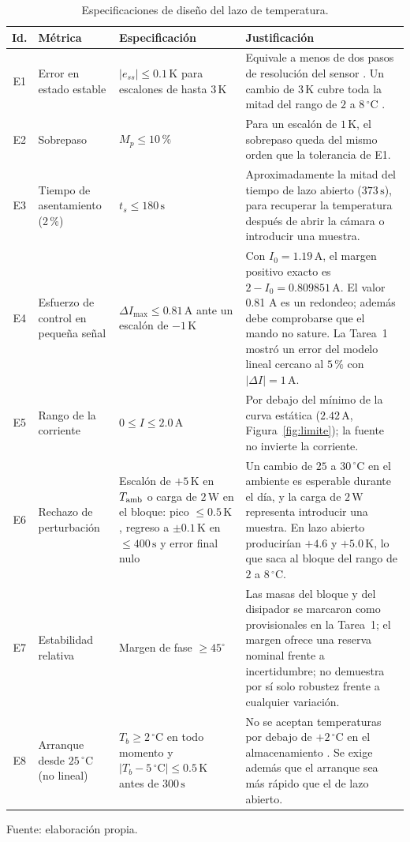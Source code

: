 \documentclass[journal,twocolumn]{IEEEtran}
\begin{document}
\begin{table}[!tbp]\centering
\caption{Especificaciones de diseño del lazo de temperatura.}\label{tab:especificaciones}
{\footnotesize\setlength{\tabcolsep}{3pt}\renewcommand{\arraystretch}{1.15}
\begin{tabularx}{\textwidth}{c>{\raggedright\arraybackslash}p{3.4cm}>{\raggedright\arraybackslash}p{5.2cm}>{\raggedright\arraybackslash}X}\toprule
Id. & Métrica & Especificación & Justificación\\\midrule
E1 & Error en estado estable & $|e_{ss}|\le0.1\,\mathrm K$ para escalones de hasta $3\,\mathrm K$ & Equivale a menos de dos pasos de resolución del sensor \cite{ds18b20}. Un cambio de $3\,\mathrm K$ cubre toda la mitad del rango de $2$ a $8\,^\circ\mathrm C$ \cite{who_pqs}.\\
E2 & Sobrepaso & $M_p\le10\,\%$ & Para un escalón de $1\,\mathrm K$, el sobrepaso queda del mismo orden que la tolerancia de E1.\\
E3 & Tiempo de asentamiento (2\,\%) & $t_s\le180\,\mathrm s$ & Aproximadamente la mitad del tiempo de lazo abierto ($373\,\mathrm s$), para recuperar la temperatura después de abrir la cámara o introducir una muestra.\\
E4 & Esfuerzo de control en pequeña señal & $\Delta I_{\max}\le0.81\,\mathrm A$ ante un escalón de $-1\,\mathrm K$ & Con $I_0=1.19\,\mathrm A$, el margen positivo exacto es $2-I_0=0.809851\,\mathrm A$. El valor 0.81 A es un redondeo; además debe comprobarse que el mando no sature. La Tarea~1 mostró un error del modelo lineal cercano al $5\,\%$ con $|\Delta I|=1\,\mathrm A$.\\
E5 & Rango de la corriente & $0\le I\le2.0\,\mathrm A$ & Por debajo del mínimo de la curva estática ($2.42\,\mathrm A$, Figura~\ref{fig:limite}); la fuente no invierte la corriente.\\
E6 & Rechazo de perturbación & Escalón de $+5\,\mathrm K$ en $T_{\rm amb}$ o carga de $2\,\mathrm W$ en el bloque: pico $\le0.5\,\mathrm K$, regreso a $\pm0.1\,\mathrm K$ en $\le400\,\mathrm s$ y error final nulo & Un cambio de $25$ a $30\,^\circ\mathrm C$ en el ambiente es esperable durante el día, y la carga de $2\,\mathrm W$ representa introducir una muestra. En lazo abierto producirían $+4.6$ y $+5.0\,\mathrm K$, lo que saca al bloque del rango de $2$ a $8\,^\circ\mathrm C$.\\
E7 & Estabilidad relativa & Margen de fase $\ge45^\circ$ & Las masas del bloque y del disipador se marcaron como provisionales en la Tarea~1; el margen ofrece una reserva nominal frente a incertidumbre; no demuestra por sí solo robustez frente a cualquier variación.\\
E8 & Arranque desde $25\,^\circ\mathrm C$ (no lineal) & $T_b\ge2\,^\circ\mathrm C$ en todo momento y $|T_b-5\,^\circ\mathrm C|\le0.5\,\mathrm K$ antes de $300\,\mathrm s$ & No se aceptan temperaturas por debajo de $+2\,^\circ\mathrm C$ en el almacenamiento \cite{who_pqs}. Se exige además que el arranque sea más rápido que el de lazo abierto.\\\bottomrule
\end{tabularx}}
\par\smallskip\footnotesize Fuente: elaboración propia.
\end{table}
\end{document}
